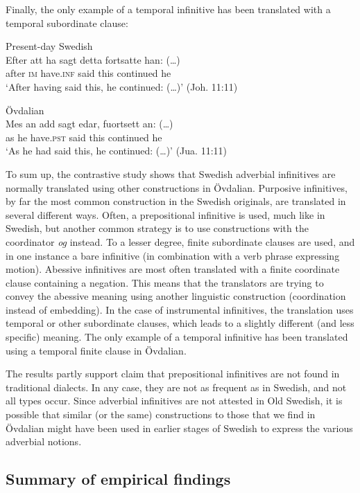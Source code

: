 \documentclass[output=paper]{langscibook}
\begin{document}
Finally, the only example of a temporal infinitive has been translated with a temporal subordinate clause: 


\ea
\label{ex:kalm:30}
\ea Present-day Swedish\label{ex:kalm:30a}\\ 
\gll Efter att ha sagt detta fortsatte han: (…)\\
 after \textsc{im} have.\textsc{inf} said this continued he\\
\glt ‘After having said this, he continued: (…)’ (Joh. 11:11)

\ex Övdalian\label{ex:kalm:30b}\\
\gll Mes an add sagt edar, fuortsett an: (…)\\
 as he have.\textsc{pst} said this continued he\\
\glt ‘As he had said this, he continued: (…)’ (Jua. 11:11)
\z
\z 


To sum up, the contrastive study shows that Swedish adverbial infinitives are normally translated using other constructions in Övdalian. Purposive infinitives, by far the most common construction in the Swedish originals, are translated in several different ways. Often, a prepositional infinitive is used, much like in Swedish, but another common strategy is to use constructions with the coordinator \textit{og} instead. To a lesser degree, finite subordinate clauses are used, and in one instance a bare infinitive (in combination with a verb phrase expressing motion). Abessive infinitives are most often translated with a finite coordinate clause containing a negation. This means that the translators are trying to convey the abessive meaning using another linguistic construction (coordination instead of embedding). In the case of instrumental infinitives, the translation uses temporal or other subordinate clauses, which leads to a slightly different (and less specific) meaning. The only example of a temporal infinitive has been translated using a temporal finite clause in Övdalian. 

The results partly support  claim that prepositional infinitives are not found in traditional dialects. In any case, they are not as frequent as in Swedish, and not all types occur. Since adverbial infinitives are not attested in Old Swedish, it is possible that similar (or the same) constructions to those that we find in Övdalian might have been used in earlier stages of Swedish to express the various adverbial notions. 


\subsection{Summary of empirical findings}\label{sec:kalm:4.4}
\end{document}
